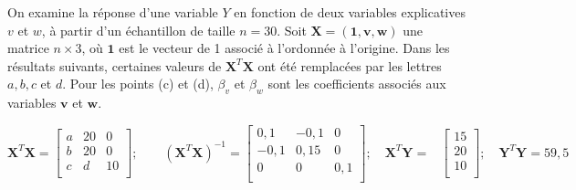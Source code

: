 \begin{questions}

\question\label{matricielle}
On examine la réponse d'une variable $Y$ en fonction de deux variables explicatives $v$ et $w$, à partir d'un échantillon de taille $n=30$. Soit $\boldsymbol{X}=(\boldsymbol{1}, \boldsymbol{v}, \boldsymbol{w})$ une matrice $n\times 3$, où $\boldsymbol{1}$ est le vecteur de 1 associé à l'ordonnée à l'origine. Dans les résultats suivants, certaines valeurs de $\boldsymbol{X}^T\boldsymbol{X}$ ont été remplacées par les lettres $a, b, c$ et $d$. Pour les points (c) et (d), $\beta_v$ et $\beta_w$ sont les coefficients associés aux variables $\boldsymbol{v}$ et $\boldsymbol{w}$.
\bigskip

\begin{center}
    $\boldsymbol{X}^T\boldsymbol{X}=\left[
\begin{array}{ccc}
  a &20 & 0\\
 b & 20& 0\\
  c &d & 10\\
\end{array}\right];\qquad
(\boldsymbol{X}^T\boldsymbol{X})^{-1}=\left[
\begin{array}{ccc}
  0,1 &-0,1 & 0\\
 -0,1 & 0,15& 0\\
  0 &0 & 0,1\\
\end{array}\right];\quad
\boldsymbol{X}^T\boldsymbol{Y}=\begin{array}{c}
\end{array}\left[
\begin{array}{r}
  15 \\
  20 \\
 10\\
\end{array}\right];\quad
\boldsymbol{Y}^T\boldsymbol{Y}=59,5
$
\end{center}


\end{questions}
